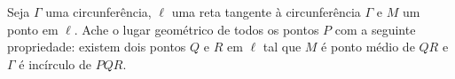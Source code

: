Seja $\Gamma$ uma circunferência, $\ell$ uma reta tangente à circunferência $\Gamma$ e $M$ um ponto em $\ell$. Ache o lugar geométrico de todos os pontos $P$ com a seguinte propriedade: existem dois pontos $Q$ e $R$ em $\ell$ tal que $M$ é ponto médio de $QR$ e $\Gamma$ é incírculo de $PQR$.
